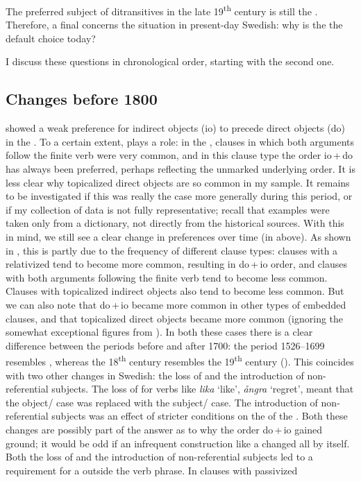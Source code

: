 \documentclass[output=paper]{langscibook}
\begin{document}
The preferred subject of  ditransitives in the late 19\textsuperscript{th} century is still the . Therefore, a final  concerns the situation in present-day Swedish: why is the  the default choice today?



I discuss these questions in chronological order, starting with the second one.


\subsection{Changes before 1800}\label{sec:falk:5.1}


 showed a weak preference for indirect objects (io) to precede direct objects (do) in the . To a certain extent,  plays a role: in the , clauses in which both arguments follow the finite verb were very common, and in this clause type the order io\,+\,do has always been preferred, perhaps reflecting the unmarked underlying order. It is less clear why topicalized direct objects are so common in my  sample. It remains to be investigated if this was really the case more generally during this period, or if my collection of data is not fully representative; recall that examples were taken only from a dictionary, not directly from the historical sources. With this in mind, we still see a clear change in preferences over time (in  above). As shown in , this is partly due to the frequency of different clause types: clauses with a relativized  tend to become more common, resulting in do\,+\,io order, and clauses with both arguments following the finite verb tend to become less common. Clauses with topicalized indirect objects also tend to become less common. But we can also note that do\,+\,io became more common in other types of embedded clauses, and that topicalized direct objects became more common (ignoring the somewhat exceptional figures from ). In both these cases there is a clear difference between the periods before and after 1700: the period 1526–1699 resembles , whereas the 18\textsuperscript{th} century resembles the 19\textsuperscript{th} century (). This coincides with two other changes in Swedish: the loss of  and the introduction of non-referential subjects. The loss of  for verbs like \textit{lika} ‘like’, \textit{ångra} ‘regret’, meant that the object/ case was replaced with the subject/ case. The introduction of non-referential subjects was an effect of stricter conditions on the  of the  \citep{Falk1993}. Both these changes are possibly part of the answer as to why the order do\,+\,io gained ground; it would be odd if an infrequent construction like a   changed all by itself. Both the loss of  and the introduction of non-referential subjects led to a requirement for a   outside the verb phrase. In clauses with passivized 
\end{document}
